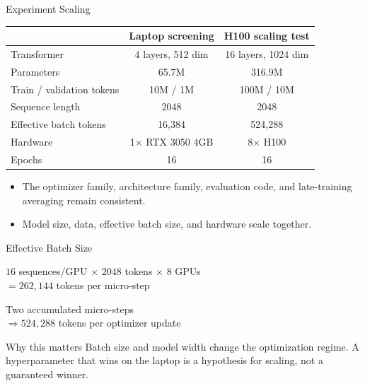\documentclass[aspectratio=169,11pt]{beamer}
\begin{document}
\begin{frame}{Experiment Scaling}
  \small
  \begin{tabular}{p{}cc}
    \toprule
    & Laptop screening & H100 scaling test \\
    \midrule
    Transformer & 4 layers, 512 dim & 16 layers, 1024 dim \\
    Parameters & 65.7M & 316.9M \\
    Train / validation tokens & 10M / 1M & 100M / 10M \\
    Sequence length & 2048 & 2048 \\
    Effective batch tokens & 16,384 & 524,288 \\
    Hardware & 1$\times$ RTX 3050 4GB & 8$\times$ H100 \\
    Epochs & 16 & 16 \\
    \bottomrule
  \end{tabular}
  \par
  \vspace{0.45cm}
  \begin{itemize}
    \item The optimizer family, architecture family, evaluation code, and
      late-training averaging remain consistent.
    \item Model size, data, effective batch size, and hardware scale together.
  \end{itemize}
\end{frame}

\begin{frame}{Effective Batch Size}
  \begin{center}
    \Large
    $16$ sequences/GPU $\times$ $2048$ tokens $\times$ $8$ GPUs\\[0.3em]
    $=262{,}144$ tokens per micro-step
  \end{center}
  \vspace{0.4cm}
  \begin{center}
    Two accumulated micro-steps\\[0.3em]
    $\Rightarrow 524{,}288$ tokens per optimizer update
  \end{center}
  \vspace{0.5cm}
  \begin{block}{Why this matters}
    Batch size and model width change the optimization regime. A hyperparameter
    that wins on the laptop is a hypothesis for scaling, not a guaranteed winner.
  \end{block}
\end{frame}
\end{document}
